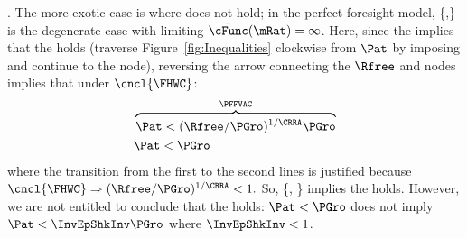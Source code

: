 \documentclass[BufferStockTheory]{subfiles}
\begin{document}
\begin{comment}
\begin{align}
  \Rfree^{1/\CRRA}\PGro^{1-1/\CRRA}\uInvEpShkuInv^{1-1/\CRRA} & < \Pat <   \Rfree^{1/\CRRA}\PGro^{1-1/\CRRA}
  \\   \uInvEpShkuInv^{1-1/\CRRA}(\Rfree/\PGro)^{1/\CRRA-1} & < \PatR < 1 < (\Rfree/\PGro)^{1/\CRRA-1}
  \\   \uInvEpShkuInv^{1-1/\CRRA}\Rfree^{1/\CRRA-1}\PGro^{1-1/\CRRA}                                                               & < \Rfree^{1/\CRRA}\DiscFac^{1/\CRRA}/\Rfree < 1 < \Rfree^{1/\CRRA-1}\PGro^{1-1/\CRRA}
  \\   \uInvEpShkuInv^{1-1/\CRRA}\Rfree^{-1}\PGro^{1-1/\CRRA}                                                               & < \DiscFac^{1/\CRRA}/\Rfree < \Rfree^{-1/\CRRA} < \Rfree^{-1}\PGro^{1-1/\CRRA}
  \\   \uInvEpShkuInv^{1-1/\CRRA}\PGro^{1-1/\CRRA}                                                               & < \DiscFac^{1/\CRRA} < \Rfree^{1-1/\CRRA} < \PGro^{1-1/\CRRA}
  \\   \uInvEpShkuInv^{(\CRRA-1)/\CRRA}\PGro^{(\CRRA-1)/\CRRA}                                                               & < \DiscFac^{1/\CRRA} < \Rfree^{(\CRRA-1)/\CRRA} < \PGro^{(\CRRA-1)/\CRRA}
  \\   \uInvEpShkuInv^{\CRRA-1} & < \DiscFac/\PGro < 1
  \\   \PGro \uInvEpShkuInv^{\CRRA-1} & < \DiscFac < \PGro
\end{align}
\end{comment}

\noindent \textbf{\cncl{\FHWC}}.  The more exotic case is where {\FHWC} does not hold; in the perfect foresight model, \{{\RIC},\cncl{\FHWC}\} is the degenerate case with limiting $\bar{\cFunc}(\mRat)=\infty$.  Here, since the {\FVAC} implies that the {\PFFVAC} holds (traverse Figure~\ref{fig:Inequalities} clockwise from $\Pat$ by imposing {\FVAC} and continue to the {\PFVAF} node), reversing the arrow connecting the $\Rfree$ and {\PFVAF} nodes implies that under $\cncl{\FHWC}$:
\begin{align*}
   & \overbrace{\Pat < (\Rfree/\PGro)^{1/\CRRA}\PGro}^{\PFFVAC}
      \\ & \Pat < \PGro
\end{align*}
where the transition from the first to the second lines is justified because $\cncl{\FHWC} \Rightarrow (\Rfree/\PGro)^{1/\CRRA}<1.$  So, \{\RIC, \cncl{\FHWC}\} implies the {\GICRaw} holds.  However, we are not entitled to conclude that the {\GICNrm} holds: $\Pat < \PGro$ does not imply $\Pat < \InvEpShkInv \PGro$ where $\InvEpShkInv<1$.  %
\end{document}
